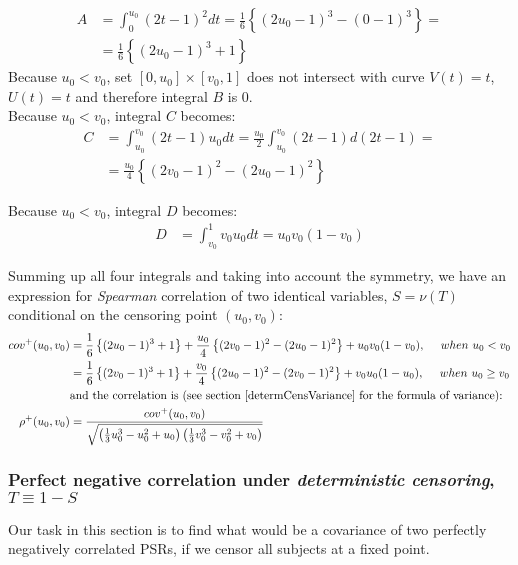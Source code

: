 \documentclass[]{article}
\begin{document}
	$$
	\begin{aligned}
    A &= \int_0^{u_0} (2t - 1)^2 dt = \frac{1}{6}\left\{  (2u_0 - 1)^3 - (0-1)^3\right\}=\\
     &= \frac{1}{6}\left\{  (2u_0 - 1)^3 + 1\right\}
	\end{aligned}
	$$
Because $u_0 < v_0$, set $[0, u_0]\times [v_0, 1]$ does not intersect with curve $V(t)=t$, $U(t) = t$ and therefore integral $B$ is 0.\\
Because $u_0 < v_0$,  integral $C$ becomes:
	$$
	\begin{aligned}
    C &= \int_{u_0}^{v_0} (2t - 1)u_0 dt = \frac{u_0}{2} \int_{u_0}^{v_0}  (2t - 1) d(2t - 1) = \\
    &= \frac{u_0}{4}\left\{  (2v_0 - 1)^2 -(2u_0 - 1)^2 \right\}
	\end{aligned}
	$$

Because $u_0 < v_0$,  integral $D$ becomes:
	$$
	\begin{aligned}
    D &= \int_{v_0}^{1} v_0 u_0 dt = u_0 v_0 (1 - v_0)
	\end{aligned}
	$$

Summing up all four integrals and taking into account the symmetry, we have an expression for \emph{Spearman} correlation of two identical variables, $S = \nu( T)$ conditional on the censoring point $(u_0, v_0)$:
	$$
	\begin{aligned}
   cov^+(u_0, v_0) &= \frac{1}{6}\left\{  (2u_0 - 1)^3 +1\right\} +  \frac{u_0}{4}\left\{  (2v_0 - 1)^2 -(2u_0 - 1)^2 \right\} + u_0 v_0 (1 - v_0), ~~~~when~u_0 < v_0\\
    &= \frac{1}{6}\left\{  (2v_0 - 1)^3 +1\right\} +  \frac{v_0}{4}\left\{  (2u_0 - 1)^2 -(2v_0 - 1)^2 \right\} + v_0 u_0 (1 - u_0), ~~~~when~u_0 \geq v_0\\
    &\text{and the correlation is (see section \ref{determCensVariance} for the formula of variance):}\\
      \rho^+ (u_0, v_0) &= \frac{cov^+(u_0, v_0)}{\sqrt{\left(  \frac{1}{3} u_0^3 - u_0^2 + u_0  \right)  \left(  \frac{1}{3} v_0^3 - v_0^2 + v_0  \right)}}
	\end{aligned}
	$$

\subsubsection{Perfect negative correlation under \emph{deterministic censoring}, $T\equiv 1-S$}

Our task in this section is to find what would be a covariance of two perfectly negatively correlated PSRs, if we censor all subjects at a fixed point.\\
\end{document}
